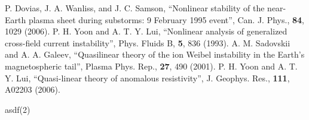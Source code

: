\documentclass{gshs-report-v1.1}
\begin{document}
\begin{thebibliography}{99}
 P. Dovias, J. A. Wanliss, and J. C. Samson, ``Nonlinear stability of the near-Earth plasma sheet during substorms: 9 February 1995 event'', Can. J. Phys., {\bf 84}, 1029 (2006).
 P. H. Yoon and A. T. Y. Lui, ``Nonlinear analysis of generalized cross-field current instability'', Phys. Fluids B, {\bf 5}, 836 (1993).
 A. M. Sadovskii and A. A. Galeev, ``Quasilinear theory of the ion Weibel instability in the Earth's magnetospheric tail'', Plasma Phys. Rep., {\bf 27}, 490 (2001).
 P. H. Yoon and A. T. Y. Lui, ``Quasi-linear theory of anomalous resistivity'', J. Geophys. Res., {\bf 111}, A02203 (2006).

 asdf(2)
\end{thebibliography}

%
%
%
%
%
\end{document}
